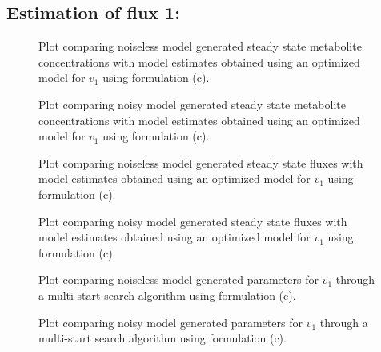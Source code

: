 \documentclass[10pt]{article}
\begin{document}
	\subsection{Estimation of flux 1:}
	\begin{figure}[!tbhp]
		\caption{Plot comparing noiseless model generated steady state metabolite concentrations with model estimates obtained using an optimized model for $v_1$ using formulation (c). }
	\end{figure}
	\begin{figure}[!tbhp]
		\caption{Plot comparing noisy model generated steady state metabolite concentrations with model estimates obtained using an optimized model for $v_1$ using formulation (c). }
	\end{figure}
	\begin{figure}[!tbhp]
		\caption{Plot comparing noiseless model generated steady state fluxes with model estimates obtained using an optimized model for $v_1$ using formulation (c). }
	\end{figure}
	\begin{figure}[!tbhp]
		\caption{Plot comparing noisy model generated steady state fluxes with model estimates obtained using an optimized model for $v_1$ using formulation (c). }
	\end{figure}
	\begin{figure}[!tbhp]
		\caption{Plot comparing noiseless model generated parameters for $v_1$ through a multi-start search algorithm using formulation (c). }
	\end{figure}
	\begin{figure}[!tbhp]
		\caption{Plot comparing noisy model generated parameters for $v_1$ through a multi-start search algorithm using formulation (c). }
	\end{figure}
	\clearpage
\end{document}
